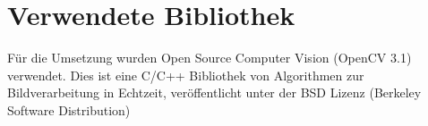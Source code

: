 \section{Verwendete Bibliothek}
\label{Libary}
Für die Umsetzung wurden Open Source Computer Vision (OpenCV 3.1) verwendet. Dies ist eine C/C++ Bibliothek von Algorithmen zur Bildverarbeitung in Echtzeit, veröffentlicht unter der BSD Lizenz (Berkeley
Software Distribution)\\
\cite{OpenCv_What_Is}\cite{wiki_Wha_is_OPenCV}